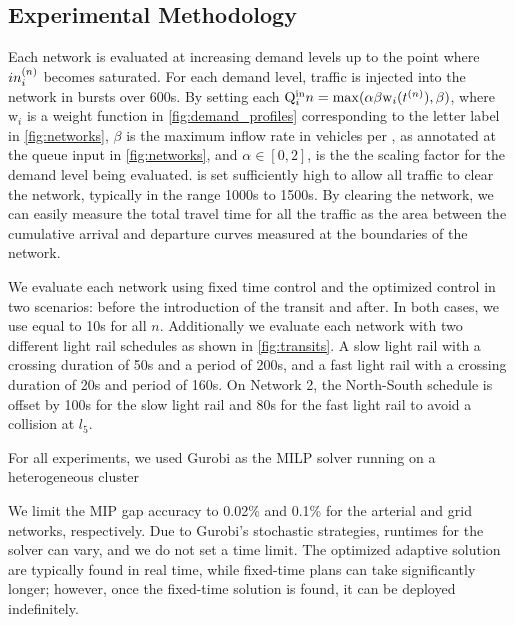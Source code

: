 \subsection{Experimental Methodology}

Each network is evaluated at increasing demand levels up to the point where $\inq{i}$
becomes saturated.
%
%
For each demand level, traffic is injected into the network in bursts over 600s.
By setting each 
$\QIN{i}{n} = \mathrm{max}(\alpha \beta \mathrm{w}_i(\tn[n]),\beta)$, where $\mathrm{w}_i$
is a weight function in \cref{fig:demand_profiles} corresponding to the letter label in 
\cref{fig:networks}, $\beta$ is the maximum inflow rate in vehicles per \DT, as annotated at the queue input in \cref{fig:networks}, and $\alpha \in [0,2]$, is the
the scaling factor for the demand level being evaluated.
\TMAX is set sufficiently high to allow all traffic to clear the network,
typically in the range 1000s to 1500s.
%
By clearing the network, we can easily measure the total travel time for all the
traffic as the area between the cumulative arrival and departure curves measured
at the boundaries of the network.
%
%
%

We evaluate each network using fixed time control and the optimized control in
two scenarios: before the introduction of the transit and
after. In both cases, we use \DT[] equal to 10s for all $n$. Additionally we evaluate each network 
with two different light rail schedules as shown in  \cref{fig:transits}. A slow light rail with a crossing duration of 50s
and a period of 200s, and a fast light rail with a crossing duration of 20s and period of 160s. On Network 2, the North-South schedule is
offset by 100s for the slow light rail and 80s for the fast light rail to avoid a collision at $l_5$.

For all experiments, we used Gurobi as the MILP solver running on a
heterogeneous cluster 

We limit the MIP gap accuracy to 0.02\% and 0.1\% for the arterial and grid
networks, respectively.
%
Due to Gurobi's stochastic strategies, runtimes for the solver can vary,
and we do not set a time limit.
%
The optimized adaptive solution are typically found in real time, while
fixed-time plans can take significantly longer; however, once the fixed-time
solution is found, it can be deployed indefinitely.




